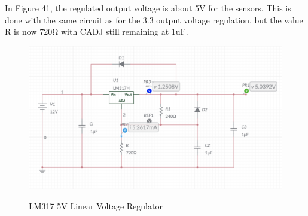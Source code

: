 In Figure 41, the regulated output voltage is about 5V for the sensors. This is done with the same circuit as for the 3.3 output voltage regulation, but the value R is now 720Ω with CADJ still remaining at 1uF.\par
\begin{figure}[H]
    \centering
    \caption{LM317 5V Linear Voltage Regulator}
    \includegraphics[width=\textwidth]{images/LM317_5_schematic.png}
    \label{fig:5V-linear-voltage-regulator}
\end{figure}
